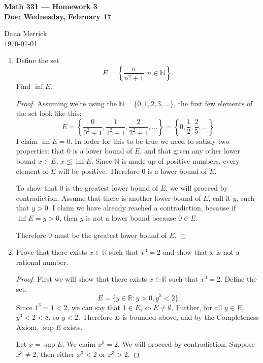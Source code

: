 \documentclass[12pt]{amsart}
\begin{document}
\thispagestyle{empty}

\begin{center}
{\bf Math 331  --- Homework 3 \\
Due:  Wednesday, February 17}
\end{center}

\bigskip

\noindent
Dana Merrick \\
\today

\bigskip

\begin{enumerate}

\setlength{\itemsep}{6pt}

\item Define the set
%
\[ E = \left\{ \frac{n}{n^2+1} : n \in \mathbb{N}\right\}. \]
%
Find $\inf E$.
\begin{proof}
Assuming we're using the $\mathbb N = \{0,1,2,3,\ldots\}$, the first few elements of the set look like this:
\[ E = \left\{ \frac{0}{0^2+1}, \frac{1}{1^2+1}, \frac{2}{2^2+1}, \ldots\right\} = 
\left\{0, \frac 1 2, \frac 2 5,\ldots\right\} \]
I claim $\inf E = 0$. In order for this to be true we need to satisfy two properties: that $0$ is a lower bound of $E$, and that given any other lower bound $x\in E$, $x\le\inf E$. Since $\mathbb N$ is made up of positive numbers, every element of $E$ will be positive. Therefore $0$ is a lower bound of $E$.

To show that $0$ is the greatest lower bound of $E$, we will proceed by contradiction. Assume that there is another lower bound of $E$, call it $y$, such that $y>0$. I claim we have already reached a contradiction, because if $\inf E = y > 0$, then $y$ is not a lower bound because $0\in E$. 

Therefore $0$ must be the greatest lower bound of $E$.
\end{proof}

\item Prove that there exists $x\in \mathbb R$ such that $x^3=2$ and
  show that $x$ is not a rational number.
 
\begin{proof}
First we will show that there exists $x\in \mathbb R$ such that $x^3=2$. Define the set:
\[ E =  \{ y \in \mathbb R : y>0, y^3 < 2 \} \]
Since $1^3 = 1 < 2$, we can say that $1\in E$, so $E\ne\emptyset$. Further, for all $y\in E$, $y^3 < 2 < 8$, so $y < 2$. Therefore $E$ is bounded above, and by the Completeness Axiom, $\sup E$ exists.

Let $x=\sup E$. We claim $x^3 = 2$. We will proceed by contradiction. Suppose $x^3\ne 2$, then either $x^3 < 2$ or $x^3 > 2$.


\end{proof}
\end{enumerate}
\end{document}
